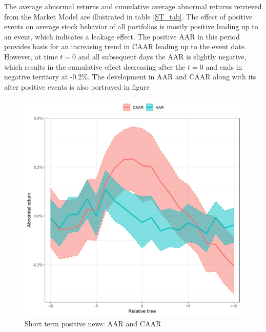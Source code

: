 The average abnormal returns and cumulative average abnormal returns retrieved from the Market Model are illustrated in table \ref{ST_tab}. 
The effect of positive events on average stock behavior of all portfolios is mostly positive leading up to an event, which indicates a leakage effect. The positive AAR in this period provides basis for an increasing trend in CAAR leading up to the event date. However, at time $t = 0$ and all subsequent days the AAR is slightly negative, which results in the cumulative effect decreasing after the $t = 0$ and ends in negative territory at -0.2\%. The development in AAR and CAAR along with its  after positive events is also portrayed in figure  
\begin{figure} [H] 
    \centering
    \includegraphics[scale=0.6]{Projekt/1.Figures analysis/ST_positive_all_CI.png}
    \caption{Short term positive news: AAR and CAAR}
    \label{fig:ST_pos_news}
\end{figure}


 \label{ST_tab}


